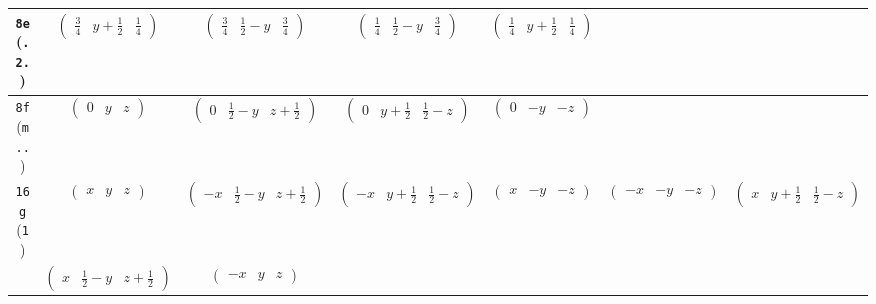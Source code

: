 \documentclass[fleqn,9pt,landscape]{jsarticle}
\begin{document}
\begin{center}
\begin{longtable}{ccccccc}
{\tt 8e} ({\tt .2.}) & $ \begin{pmatrix} \frac{3}{4} & y + \frac{1}{2} & \frac{1}{4} \end{pmatrix} $ & $ \begin{pmatrix} \frac{3}{4} & \frac{1}{2} - y & \frac{3}{4} \end{pmatrix} $ & $ \begin{pmatrix} \frac{1}{4} & \frac{1}{2} - y & \frac{3}{4} \end{pmatrix} $ & $ \begin{pmatrix} \frac{1}{4} & y + \frac{1}{2} & \frac{1}{4} \end{pmatrix} $ & $  $ & $  $ \\ \hline
{\tt 8f} ({\tt m..}) & $ \begin{pmatrix} 0 & y & z \end{pmatrix} $ & $ \begin{pmatrix} 0 & \frac{1}{2} - y & z + \frac{1}{2} \end{pmatrix} $ & $ \begin{pmatrix} 0 & y + \frac{1}{2} & \frac{1}{2} - z \end{pmatrix} $ & $ \begin{pmatrix} 0 & - y & - z \end{pmatrix} $ & $  $ & $  $ \\ \hline
{\tt 16g} ({\tt 1}) & $ \begin{pmatrix} x & y & z \end{pmatrix} $ & $ \begin{pmatrix} - x & \frac{1}{2} - y & z + \frac{1}{2} \end{pmatrix} $ & $ \begin{pmatrix} - x & y + \frac{1}{2} & \frac{1}{2} - z \end{pmatrix} $ & $ \begin{pmatrix} x & - y & - z \end{pmatrix} $ & $ \begin{pmatrix} - x & - y & - z \end{pmatrix} $ & $ \begin{pmatrix} x & y + \frac{1}{2} & \frac{1}{2} - z \end{pmatrix} $ \\
& $ \begin{pmatrix} x & \frac{1}{2} - y & z + \frac{1}{2} \end{pmatrix} $ & $ \begin{pmatrix} - x & y & z \end{pmatrix} $ & $  $ & $  $ & $  $ & $  $ \\
\end{longtable}
\end{center}
\end{document}
